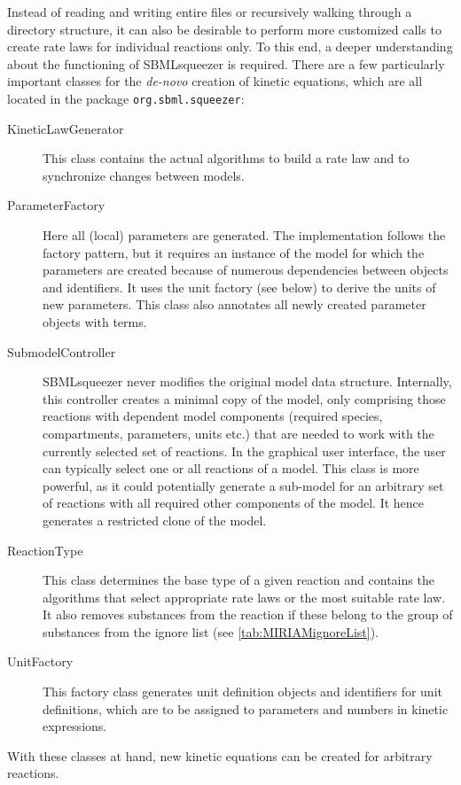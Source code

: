 Instead of reading and writing entire files or recursively walking through a directory structure, it can also be desirable to perform more customized calls to create rate laws for individual reactions only.
To this end, a deeper understanding about the functioning of SBMLsqueezer is required.
There are a few particularly important classes for the \emph{de-novo} creation of kinetic equations, which are all located in the package \texttt{org.sbml.squeezer}:
\begin{description}
  \item[KineticLawGenerator] This class contains the actual algorithms to build a rate law and to synchronize changes between models.
  \item[ParameterFactory]
    Here all (local) parameters are generated.
    The implementation follows the factory pattern, but it requires an instance of the model for which the parameters are created because of numerous dependencies between objects and identifiers.
    It uses the unit factory (see below) to derive the units of new parameters.
    This class also annotates all newly created parameter objects with \SBO terms.
  \item[SubmodelController]
    SBMLsqueezer never modifies the original model data structure.
    Internally, this controller creates a minimal copy of the model, only comprising those reactions with dependent model components (required species, compartments, parameters, units etc.) that are needed to work with the currently selected set of reactions.
    In the graphical user interface, the user can typically select one or all reactions of a model.
    This class is more powerful, as it could potentially generate a sub-model for an arbitrary set of reactions with all required other components of the model.
    It hence generates a restricted clone of the model.
  \item[ReactionType]
    This class determines the base type of a given reaction and contains the algorithms that select appropriate rate laws or the most suitable rate law.
    It also removes substances from the reaction if these belong to the group of substances from the ignore list (see  \vref{tab:MIRIAMignoreList}).
  \item[UnitFactory]
    This factory class generates unit definition objects and identifiers for unit definitions, which are to be assigned to parameters and numbers in kinetic expressions.
\end{description}
\renewcommand{\descriptionlabel}[1]{\textcolor{black}{\textbf{#1}}}
With these classes at hand, new kinetic equations can be created for arbitrary reactions.
